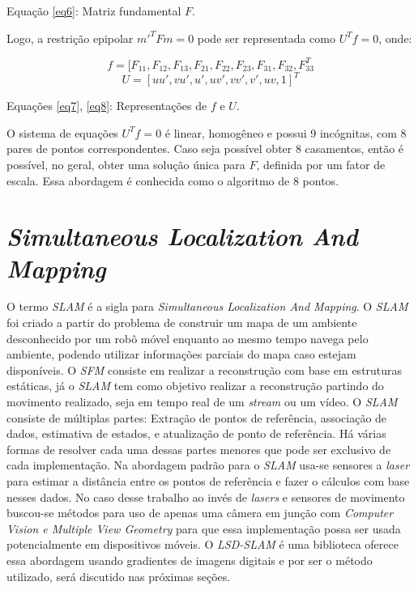 Equação \eqref{eq6}: Matriz fundamental $F$.

Logo, a restrição epipolar $m'^{T}Fm = 0$ pode ser representada como $U^{T}f = 0$, onde:

\begin{equation}\label{eq7}
f = [F_{11}, F_{12}, F_{13}, F_{21}, F_{22}, F_{23}, F_{31}, F_{32}, F_{33}^{T}
\end{equation}
\begin{equation}\label{eq8}
U = [uu', vu', u', uv', vv', v', uv,1]^{T}
\end{equation}

Equações \eqref{eq7}, \eqref{eq8}: Representações de $f$ e $U$.

O sistema de equações $U^{T}f = 0$ é linear, homogêneo e possui 9 incógnitas, com 8 pares de pontos correspondentes. Caso seja possível obter 8 casamentos, então é possível, no geral, obter uma solução única para $F$, definida por um fator de escala. Essa abordagem é conhecida como o algoritmo de 8 pontos.

\section{\textit{Simultaneous Localization And Mapping}}

O termo \textit{SLAM} é a sigla para \textit{Simultaneous Localization And Mapping}. O \textit{SLAM} foi criado a partir do problema de construir um mapa de um ambiente desconhecido por um robô móvel enquanto ao mesmo tempo navega pelo ambiente, podendo utilizar informações parciais do mapa caso estejam disponíveis. O \textit{SFM} consiste em realizar a reconstrução com base em estruturas estáticas, já o \textit{SLAM} tem como objetivo realizar a reconstrução partindo do movimento realizado, seja em tempo real de um \textit{stream} ou um vídeo. O \textit{SLAM} consiste de múltiplas partes: Extração de pontos de referência, associação de dados, estimativa de estados, e atualização de ponto de referência. Há várias formas de resolver cada uma dessas partes menores que pode ser exclusivo de cada implementação\cite{SLAM-Dummies}. Na abordagem padrão para o \textit{SLAM} usa-se sensores a \textit{laser} para estimar a distância entre os pontos de referência e fazer o cálculos com base nesses dados. No caso desse trabalho ao invés de \textit{lasers} e sensores de movimento buscou-se métodos para uso de apenas uma câmera em junção com \textit{Computer Vision e Multiple View Geometry} para que essa implementação possa ser usada potencialmente em dispositivos móveis. O \textit{LSD-SLAM} é uma biblioteca oferece essa abordagem usando gradientes de imagens digitais e por ser o método utilizado, será discutido nas próximas seções.



